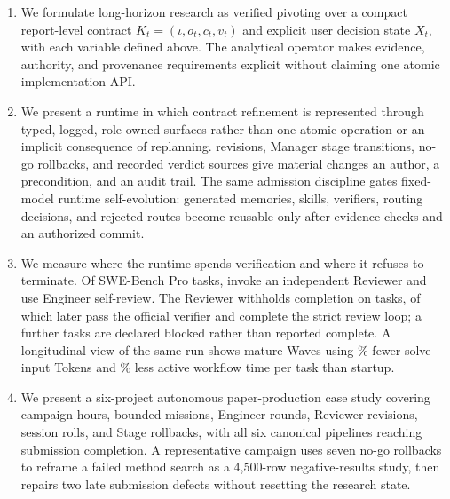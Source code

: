 \begin{enumerate}[label=\textbf{C\arabic*.}]
  \item We formulate long-horizon research as verified pivoting over a compact
    report-level contract $K_t=(\iota,o_t,c_t,v_t)$ and explicit user decision state
    $X_t$, with each variable defined above. The analytical 
    operator makes evidence, authority, and
    provenance requirements explicit without claiming one atomic implementation API.
  \item We present a runtime in which contract refinement is represented through
    typed, logged, role-owned surfaces rather than one atomic operation or an implicit
    consequence of replanning.  revisions, Manager stage
    transitions, no-go rollbacks, and recorded verdict sources give material changes
    an author, a precondition, and an audit trail. The same admission discipline
    gates fixed-model runtime self-evolution: generated memories, skills, verifiers,
    routing decisions, and rejected routes become reusable only after evidence checks
    and an authorized commit.
  \item We measure where the runtime spends verification and where it refuses to
    terminate. Of \ReviewerTasks{} SWE-Bench Pro tasks, \ReviewerInvoked{} invoke an
    independent Reviewer and \ReviewerSkipped{} use Engineer self-review. The Reviewer
    withholds completion on \ReviewerRevisionRequested{} tasks, of which
    \ReviewerVerifierRecovered{} later pass the official verifier and
    \ReviewerStrictRescues{} complete the strict review loop; a further
    \ReviewerFirstBlocked{} tasks are declared blocked rather than reported complete.
    A longitudinal view of the same run shows mature Waves using
    \SWEProTokenReduction\% fewer solve input Tokens and \SWEProTimeReduction\% less
    active workflow time per task than startup.
  \item We present a six-project autonomous paper-production case study covering
    \PaperCaseCampaignHours{} campaign-hours, \PaperCaseMissions{} bounded missions,
    \PaperCaseRounds{} Engineer rounds, \PaperCaseContinues{} Reviewer revisions,
    \PaperCaseSessionRolls{} session rolls, and \PaperCaseRollbacks{} Stage rollbacks,
    with all six canonical pipelines reaching submission completion. A representative
    campaign uses seven no-go rollbacks to reframe a failed method search as a
    4,500-row negative-results study, then repairs two late submission defects
    without resetting the research state.

\end{enumerate}
